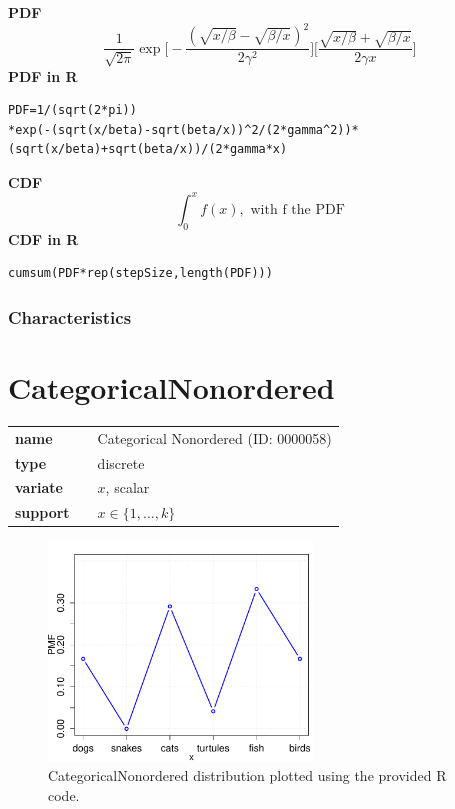 \smallskip \noindent \hspace{.2cm} \textbf{PDF} 
\begin{equation*}\frac{1}{\sqrt{2\pi}}\exp\Big[-\frac{(\sqrt{x/\beta}-\sqrt{\beta/x})^2}{2\gamma^2}\Big]\Big[\frac{\sqrt{x/\beta}+\sqrt{\beta/x}}{2\gamma x}\Big]\end{equation*}
\smallskip \noindent \hspace{.2cm} \textbf{PDF in R}  
\begin{verbatim}PDF=1/(sqrt(2*pi))
*exp(-(sqrt(x/beta)-sqrt(beta/x))^2/(2*gamma^2))*(sqrt(x/beta)+sqrt(beta/x))/(2*gamma*x)
\end{verbatim}
\smallskip \noindent \hspace{.2cm} \textbf{CDF} 
\begin{equation*}\int_0^x f(x),
\text { with f the PDF}\end{equation*}
\smallskip \noindent \hspace{.2cm} \textbf{CDF in R}  
\begin{verbatim}
cumsum(PDF*rep(stepSize,length(PDF)))
\end{verbatim}
\smallskip
\subsubsection*{Characteristics}
\smallskip
\section*{CategoricalNonordered} 

  \bigskip 

\begin{tabular}{p{2cm}cl}
\textbf{name} & & Categorical Nonordered (ID: 0000058)\\ 
 
\textbf{type} & & discrete \\ 

\textbf{variate} & & $x$, scalar \\ 

\textbf{support} & & $x \in \{1,\dots,k\}$
\end{tabular}

\begin{figure}[ht!]
\centering
  \includegraphics[width=70mm]{pics/CategoricalNonordered.pdf}
 \caption{CategoricalNonordered distribution plotted using the provided R code.}
 \label{fig:CategoricalNonordered}
\end{figure}

